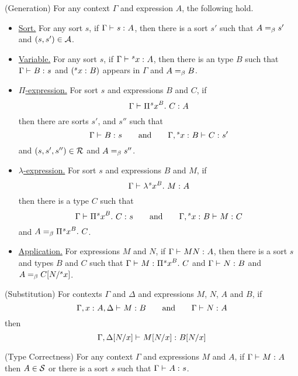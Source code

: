 \documentclass{article}
\begin{document}
\begin{lemma}
\label{lem:generation}
(Generation)
For any context $\Gamma$ and expression $A$, the following hold.
\begin{itemize}
\item \underline{Sort.} For any sort $s$, if $\Gamma \vdash_{} {{s} :^{} {A}}$, then there is a sort $s'$ such that $A =_\beta s'$ and $(s, s') \in \mathcal A$.
\item \underline{Variable.} For any sort $s$, if $\Gamma \vdash_{} {{{}^{s}{x}} :^{} {A}}$, then there is an type $B$ such that $\Gamma \vdash_{} {{B} :^{} {s}}$ and $({{{}^{s}{x}} :^{} {B}})$ appears in $\Gamma$ and $A =_\beta B$.
\item \underline{$\Pi$-expression.} For sort $s$ and expressions $B$ and $C$, if
\[
    \Gamma \vdash_{} {{{\Pi^{} {{}^{s}{x}}^{B}. \ {C}}} :^{} {A}}
\]
then there are sorts $s'$, and $s''$ such that
\[
    \Gamma \vdash_{} {{B} :^{} {s}} \qquad \text{and} \qquad \Gamma, {{{}^{s}{x}} :^{} {B}} \vdash_{} {{C} :^{} {s'}}
\]
and $(s, s', s'') \in \mathcal R$ and $A =_\beta s''$.
\item \underline{$\lambda$-expression.} For sort $s$ and expressions $B$ and $M$, if\
\[
\Gamma \vdash_{} {{\lambda^{} {}^{s}{x}^{B}. \ M} :^{} {A}}
\]
then there is a type $C$ such that
\[
\Gamma \vdash_{} {{{\Pi^{} {{}^{s}{x}}^{B}. \ {C}}} :^{} {s}} \qquad \text{and} \qquad \Gamma, {{{}^{s}{x}} :^{} {B}} \vdash_{} {{M} :^{} {C}}
\]
and $A =_\beta {\Pi^{} {{}^{s}{x}}^{B}. \ {C}}$.
\item \underline{Application.} For expressions $M$ and $N$, if $\Gamma \vdash_{} {{MN} :^{} {A}}$, then there is a sort $s$ and types $B$ and $C$ such that $\Gamma \vdash_{} {{M} :^{} {{\Pi^{} {{}^{s}{x}}^{B}. \ {C}}}}$ and $\Gamma \vdash_{} {{N} :^{} {B}}$ and $A =_\beta C[N/{}^{s}{x}]$.
\end{itemize}
\end{lemma}


\begin{lemma}
\label{lem:substition}
(Substitution)
For contexts $\Gamma$ and $\Delta$ and expressions $M$, $N$, $A$ and $B$, if
\[
    \Gamma, {{x} :^{} {A}}, \Delta \vdash_{} {{M} :^{} {B}} \qquad \text{and} \qquad \Gamma \vdash_{} {{N} :^{} {A}}
\]
then
\[
    \Gamma, \Delta[N/x] \vdash_{} {{M[N/x]} :^{} {B[N/x]}}
\]
\end{lemma}

\begin{lemma}
\label{lem:type-correctness}
(Type Correctness)
For any context $\Gamma$ and expressions $M$ and $A$, if $\Gamma \vdash_{} {{M} :^{} {A}}$ then $A \in \mathcal S$ or there is a sort $s$ such that $\Gamma \vdash_{} {{A} :^{} {s}}$.
\end{lemma}
\end{document}
